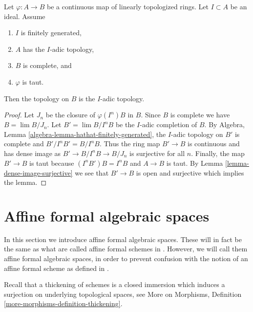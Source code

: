 \begin{lemma}
\label{lemma-taut-is-adic}
Let $\varphi : A \to B$ be a continuous map of linearly topologized rings.
Let $I \subset A$ be an ideal. Assume
\begin{enumerate}
\item $I$ is finitely generated,
\item $A$ has the $I$-adic topology,
\item $B$ is complete, and
\item $\varphi$ is taut.
\end{enumerate}
Then the topology on $B$ is the $I$-adic topology.
\end{lemma}

\begin{proof}
Let $J_n$ be the closure of $\varphi(I^n)B$ in $B$.
Since $B$ is complete we have $B = \lim B/J_n$.
Let $B' = \lim B/I^nB$ be the $I$-adic completion of $B$.
By Algebra, Lemma \ref{algebra-lemma-hathat-finitely-generated},
the $I$-adic topology on $B'$ is complete and
$B'/I^nB' = B/I^nB$. Thus the ring map $B' \to B$ is continuous
and has dense image as $B' \to B/I^nB \to B/J_n$ is surjective
for all $n$. Finally, the map $B' \to B$ is taut
because $(I^nB')B = I^nB$ and $A \to B$ is taut.
By Lemma \ref{lemma-dense-image-surjective} we see that $B' \to B$ is open
and surjective which implies the lemma.
\end{proof}



\section{Affine formal algebraic spaces}
\label{section-affine-formal-algebraic-spaces}

\noindent
In this section we introduce affine formal algebraic spaces.
These will in fact be the same as what are called affine
formal schemes in \cite{BVGD}. However, we will call
them affine formal algebraic spaces, in order to prevent confusion with
the notion of an affine formal scheme as defined in \cite{EGA}.

\medskip\noindent
Recall that a thickening of schemes is a closed
immersion which induces a surjection on underlying topological
spaces, see More on Morphisms, Definition
\ref{more-morphisms-definition-thickening}.

